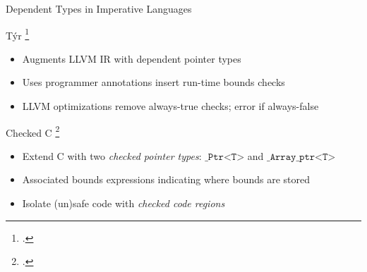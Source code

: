 \documentclass[aspectratio=169]{beamer}
\begin{document}
\begin{frame}{Dependent Types in Imperative Languages}

T\'yr \footcite{de_araujo_tyr:_2016}
\vspace{-0.1in}
\begin{itemize}
    \item Augments LLVM IR with dependent pointer types
    \item Uses programmer annotations insert run-time bounds checks
    \item LLVM optimizations remove always-true checks; error if always-false
\end{itemize}

\pause

Checked C \footcite{ruef_checked_2017}
\vspace{-0.1in}
    \begin{itemize}
        \item Extend C with two \emph{checked pointer types}: $\texttt{\_Ptr<T>}$ and $\texttt{\_Array\_ptr<T>}$ 
        \item Associated bounds expressions indicating where bounds are stored
        \item Isolate (un)safe code with \emph{checked code regions}  
    \end{itemize}


\end{frame}
\end{document}
